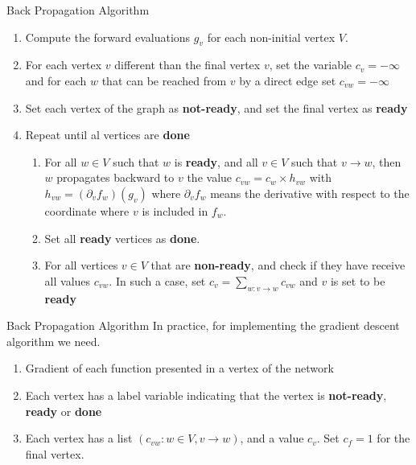 \documentclass[9pt,xcolor=table]{beamer}
\begin{document}
\begin{frame}{Back Propagation Algorithm}
	\Large
	{
		\begin{enumerate}
			\item Compute the forward evaluations $g_v$ for each non-initial vertex $V$.
			\item For each vertex $v$ different than the final vertex $v$, set the variable $c_v = -\infty$ and for each $w$ that can be reached from $v$ by a direct edge set $c_{vw}= -\infty$ 
			\item Set each vertex of the graph as \textbf{not-ready}, and set the final vertex as \textbf{ready}
			\item Repeat until al vertices are \textbf{done}
			\begin{enumerate}
				\item[i.] For all $w \in V$ such that $w$ is \textbf{ready}, and all $v \in V$ such that $v \to w$, then $w$ propagates backward to $v$ the value $c_{vw}=c_{w} \times h_{vw}$ with $h_{vw} = (\partial_v f_w)(g_v)$ where $\partial_v f_w$ means the derivative with respect to the coordinate where $v$ is included in $f_w$.
				\item[ii.] Set all \textbf{ready} vertices as \textbf{done}. 
				\item[iii.] For all vertices $v \in V$ that are \textbf{non-ready}, and check if they have receive all values $c_{vw}$. In such a case, set $c_v = \sum_{w: v\to w} c_{vw}$ and $v$ is set to be \textbf{ready}
			\end{enumerate}
		\end{enumerate}
	}
\end{frame}

\begin{frame}{Back Propagation Algorithm}
	In practice, for implementing the gradient descent algorithm we need. 
	
	\begin{enumerate}
		\item Gradient of each function presented in a vertex of the network
		\item Each vertex has a label variable indicating that the vertex is \textbf{not-ready}, \textbf{ready} or \textbf{done}
		\item Each vertex has a list $(c_{vw}: w\in V, v\to w)$, and a value $c_v$. Set $c_f = 1$ for the final vertex.
	\end{enumerate}
\end{frame}
\end{document}
